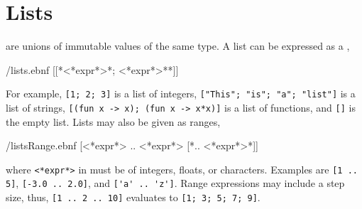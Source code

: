 \documentclass[fsharpNotes.tex]{subfiles}
\begin{document}

\chapter{Lists}
 are unions of immutable values of the same type. A list can be expressed as a ,
%
\begin{verbatimwrite}{\ebnf/lists.ebnf}
[[*<*expr*>{*; <*expr*>*}*]]
\end{verbatimwrite}
%
For example, \mbox{\lstinline![1; 2; 3]!} is a list of integers, \mbox{\lstinline!["This"; "is"; "a"; "list"]!} is a list of strings, \mbox{\lstinline![(fun x -> x); (fun x -> x*x)]!} is a list of functions, and \lstinline![]! is the empty list. Lists may also be given as ranges,
%
\begin{verbatimwrite}{\ebnf/listsRange.ebnf}
[<*expr*> .. <*expr*> [*.. <*expr*>*]]
\end{verbatimwrite}
%
where \lstinline[language=syntax]{<*expr*>} in  must be of integers, floats, or characters. Examples are \mbox{\lstinline![1 .. 5]!}, \mbox{\lstinline![-3.0 .. 2.0]!}, and \mbox{\lstinline!['a' .. 'z']!}. Range expressions may include a step size, thus, \mbox{\lstinline![1 .. 2 .. 10]!} evaluates to \mbox{\lstinline![1; 3; 5; 7; 9]!}.
\end{document}
